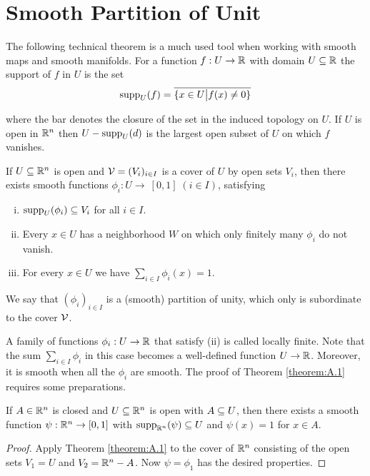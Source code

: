 \chapter{Smooth Partition of Unit}
The following technical theorem is a much used tool when working with smooth
maps and smooth manifolds.
For a function $f:U\to\mathbb{R}$ with domain $U\subseteq\mathbb{R}$ the support of $f$ in $U$ is the set
\begin{align*}
  \mathrm{supp}_U(f) = \overline{\{x\in U\big| f(x)\neq 0\}}
\end{align*}

where the bar denotes the closure of the set in the induced topology on $U$. If $U$ is open 
in $\mathbb{R}^n$ then $U-\mathrm{supp}_U(d)$ is the largest open subset of $U$ on which $f$ vanishes.

\begin{theorem}\label{theorem:A.1}
  If $U\subseteq\mathbb{R}^n$ is open and $\mathcal{V} = (V_i)_{i\in I}$ is a cover of $U$ by open sets $V_i$, then there exists 
  smooth functions $\phi_i:U\to\ [0, 1]\; (i\in I)$, satisfying 
  \begin{enumerate}[(i)]
    \item $\mathrm{supp}_U(\phi_i)\subseteq V_i$ for all $i\in I$.
    \item Every $x\in U$ has a neighborhood $W$ on which only finitely many $\phi_i$ do not vanish.
    \item For every $x\in U$ we have $\sum_{i\in I} \phi_i(x) = 1$.
  \end{enumerate}
  We say that $(\phi_i)_{i\in I}$ is a (smooth) partition of unity, which only is subordinate to the 
  cover $\mathcal{V}$.
\end{theorem}

A family of functions $\phi_i:U\to\mathbb{R}$ that satisfy (ii) is called locally finite. Note that
the sum $\sum_{i\in I}\phi_i$ in this case becomes a well-defined function $U\to\mathbb{R}$. Moreover,
it is smooth when all the $\phi_i$ are smooth. The proof of Theorem \ref{theorem:A.1} requires
some preparations.


\begin{lemma}\label{lemma:A.7}
  If $A\in\mathbb{R}^n$ is closed and $U\subseteq\mathbb{R}^n$ is open with $A\subseteq U$, then there exists 
  a smooth function $\psi:\mathbb{R}^n\to [0, 1]$ with $\operatorname{supp}_{\mathbb{R}^n}(\psi)\subseteq U$ and $\psi(x)=1$
  for $x\in A$.
\end{lemma}

\begin{proof}
  Apply Theorem \ref{theorem:A.1} to the cover of $\mathbb{R}^n$ consisting of the open sets $V_1=U$
and $V_2 = \mathbb{R}^n - A$. Now $\psi = \phi_1$ has the desired properties.
\end{proof}

